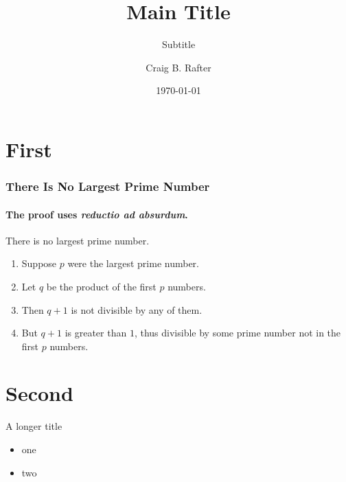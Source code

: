 \documentclass{beamer}
\title{Main Title}
\subtitle{Subtitle}
\date{\today}
\author{Craig B. Rafter}
\institute{Transportation Research Group}
\begin{document}
	\begin{frame}[plain]
		\titlepage
	\end{frame}
	
	
	\section{First}
	\begin{frame} 
		\frametitle{There Is No Largest Prime Number} 
		\framesubtitle{The proof uses \textit{reductio ad absurdum}.} 
		\begin{theorem}
			There is no largest prime number. \end{theorem} 
		\begin{enumerate} 
			\item<1-| alert@1> Suppose $p$ were the largest prime number. 
			\item<2-> Let $q$ be the product of the first $p$ numbers. 
			\item<3-> Then $q+1$ is not divisible by any of them. 
			\item<1-> But $q + 1$ is greater than $1$, thus divisible by some prime
			number not in the first $p$ numbers.
		\end{enumerate}
	\end{frame}
	
	\section{Second}
	\begin{frame}{A longer title}
		\begin{itemize}
			\item one
			\item two
		\end{itemize}
	\end{frame}
	
\end{document}
